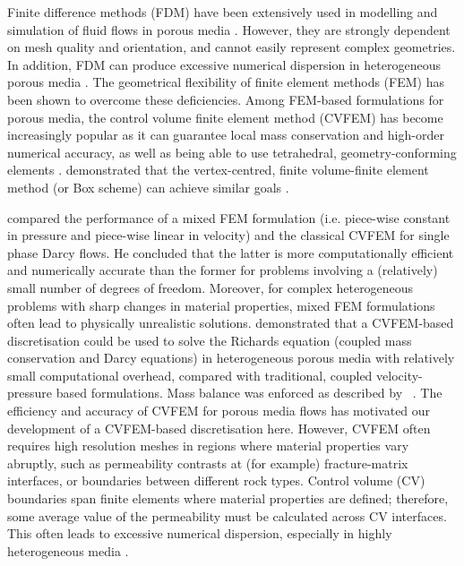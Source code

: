 \documentclass[preprint,authoryear,12pt]{elsarticle}
\begin{document}
Finite difference methods (FDM) have been extensively used in
modelling and simulation of fluid flows in porous media
\citep{aziz_1986, chen_1997, chen_2005}.  However, they are strongly
dependent on mesh quality and orientation, and cannot easily represent
complex geometries. In addition, FDM can produce excessive numerical
dispersion in heterogeneous porous media \citep{chavent_1986}. The
geometrical flexibility of finite element methods (FEM) has been shown
to overcome these deficiencies. Among FEM-based formulations for
porous media, the control volume finite element method (CVFEM) has
become increasingly popular as it can guarantee local mass
conservation and high-order numerical accuracy, as well as being able
to use tetrahedral, geometry-conforming elements \citep{forsyth_1990,
  cordazzo_2004, geiger_2004, hurtado_2007}. \citet{huber_2000}
demonstrated that the vertex-centred, finite volume-finite element
method (or Box scheme) can achieve similar goals \citep[see
  also][]{helmig_1997}.

\citet{durlofsky_1993,durlofsky_1994} compared the performance of a
mixed FEM formulation (i.e. piece-wise constant in pressure and
piece-wise linear in velocity) and the classical CVFEM for single
phase Darcy flows. He concluded that the latter is more
computationally efficient and numerically accurate than the former for
problems involving a (relatively) small number of degrees of
freedom. Moreover, for complex heterogeneous problems with sharp
changes in material properties, mixed FEM formulations often lead to
physically unrealistic solutions.  \citet{cumming_2011} demonstrated
that a CVFEM-based discretisation could be used to solve the Richards
equation (coupled mass conservation and Darcy equations) in
heterogeneous porous media with relatively small computational
overhead, compared with traditional, coupled velocity-pressure based
formulations.  Mass balance was enforced as described by
\citet{kirkland_1992}~\citep[see
  also][]{forsyth_1990,cumming_phd2012}.  The efficiency and accuracy
of CVFEM for porous media flows has motivated our development of a
CVFEM-based discretisation here.  However, CVFEM often requires high
resolution meshes in regions where material properties vary abruptly,
such as permeability contrasts at (for example) fracture-matrix
interfaces, or boundaries between different rock types. Control volume
(CV) boundaries span finite elements where material properties are
defined; therefore, some average value of the permeability must be
calculated across CV interfaces. This often leads to excessive
numerical dispersion, especially in highly heterogeneous media
\citep{nick_2011b, nick_2011a}.
\end{document}
